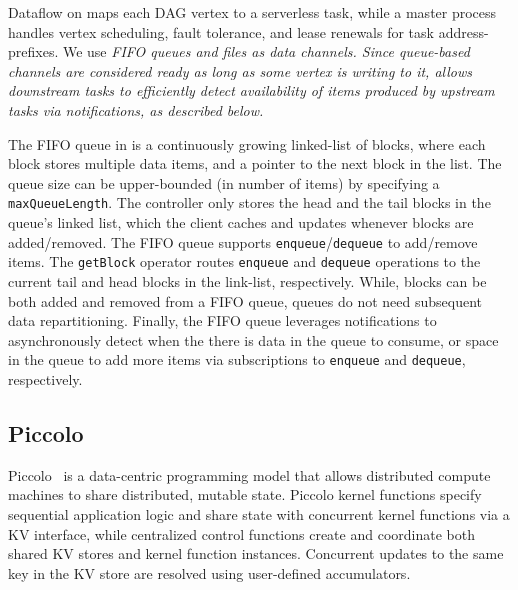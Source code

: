 Dataflow on \jiffy maps each DAG vertex to a serverless task,
while a master process handles vertex scheduling,
fault tolerance, and lease renewals for task address-prefixes. We use \sl FIFO
queues and files as data channels. Since queue-based channels are considered 
ready as long as some vertex is writing to it, \sl allows downstream tasks 
to efficiently detect availability of items produced by upstream tasks 
via notifications, as described below.

 The FIFO queue in \jiffy is a continuously growing linked-list of blocks, where each block stores multiple data items, and a pointer to the next block in the list. The queue size can be upper-bounded (in number of items) by specifying a \texttt{maxQueueLength}. The controller only stores the head and the tail blocks in the queue's linked list, which the client caches and updates whenever blocks are added/removed. The FIFO queue supports \texttt{enqueue}/\texttt{dequeue} to add/remove items. The \texttt{getBlock} operator routes \texttt{enqueue} and \texttt{dequeue} operations to the current tail and head blocks in the link-list, respectively. While, blocks can be both added and removed from a FIFO queue, queues do not need subsequent data repartitioning. Finally, the FIFO queue leverages \jiffy notifications to asynchronously detect when the there is data in the queue to consume, or space in the queue to add more items via subscriptions to \texttt{enqueue} and \texttt{dequeue}, respectively. %


\subsection{Piccolo}
\label{ssec:piccolo}

Piccolo~\cite{piccolo} is a data-centric programming model that allows
distributed compute machines to share distributed,
mutable state. Piccolo
kernel functions specify sequential application logic and share
state with concurrent kernel functions via a KV
interface, while centralized control functions create and coordinate both shared
KV stores and kernel function instances. Concurrent updates to 
the same key in the KV store are resolved using 
user-defined accumulators. 

